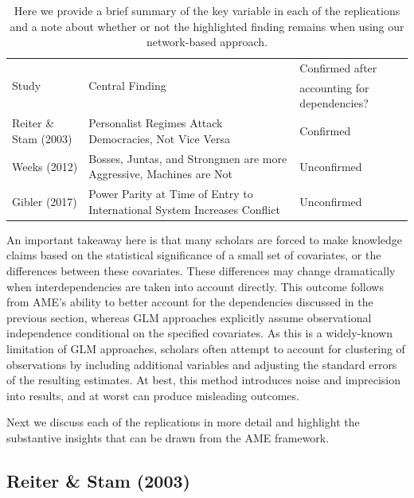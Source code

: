 \begin{table}[ht]
\centering
\caption{Here we provide a brief summary of the key variable in each of the replications and a note about whether or not the highlighted finding remains when using our network-based approach.}
	\begin{tabular}{l p{6cm} l} \toprule
		\multirow{2}{*}{Study} & \multirow{2}{*}{Central Finding} &  Confirmed after \\
		& &  accounting for dependencies? \\ \toprule
		Reiter \& Stam (2003) & Personalist Regimes Attack Democracies, Not Vice Versa & {Confirmed} \\ \midrule
		Weeks (2012) & Bosses, Juntas, and Strongmen are more Aggressive, Machines are Not & {Unconfirmed} \\\midrule
		Gibler (2017) & Power Parity at Time of Entry to International System Increases Conflict & {Unconfirmed}\\ \bottomrule
	\end{tabular}
	\label{tab:modelFindingSumm}
\end{table}

An important takeaway here is that many scholars are forced to make knowledge claims based on the statistical significance of a small set of covariates, or the differences between these covariates. These differences may change dramatically when interdependencies are taken into account directly. This outcome follows from AME's ability to better account for the dependencies discussed in the previous section, whereas GLM approaches explicitly assume observational independence conditional on the specified covariates. As this is a widely-known limitation of GLM approaches, scholars often attempt to account for clustering of observations by including additional variables and adjusting the standard errors of the resulting estimates. At best, this method introduces noise and imprecision into results, and at worst can produce misleading outcomes. 

Next we discuss each of the replications in more detail and highlight the substantive insights that can be drawn from the AME framework.

\subsection{Reiter \& Stam (2003)}

